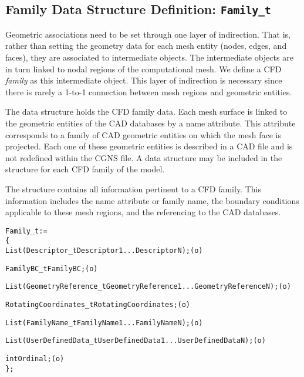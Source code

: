 \subsection{Family Data Structure Definition: \texttt{Family\_t}}
\label{s:Family}

Geometric associations need to be set through one layer of indirection.
That is, rather than setting the geometry data for each mesh entity
(nodes, edges, and faces), they are associated to intermediate objects.
The intermediate objects are in turn linked to nodal regions of the
computational mesh.
We define a CFD \emph{family} as this intermediate object.
This layer of indirection is necessary since there is rarely a 1-to-1
connection between mesh regions and geometric entities.

The  data structure holds the CFD family data.
Each mesh surface is linked to the geometric entities of the CAD databases
by a name attribute.
This attribute corresponds to a family of CAD geometric entities on which
the mesh face is projected.
Each one of these geometric entities is described in a CAD file and is not
redefined within the CGNS file.
A  data structure may be included in the 
structure for each CFD family of the model.

The  structure contains all information pertinent to a
CFD family.
This information includes the name attribute or family name, the
boundary conditions applicable to these mesh regions, and the referencing
to the CAD databases.

\begin{alltt}
  Family\_t :=
    \{
    List( Descriptor\_t Descriptor1 ... DescriptorN ) ;                      (o)

    FamilyBC\_t FamilyBC ;                                                   (o)

    List( GeometryReference\_t GeometryReference1 ... GeometryReferenceN ) ; (o)

    RotatingCoordinates\_t RotatingCoordinates ;                             (o)

    List( FamilyName\_t FamilyName1 ... FamilyNameN ) ;                      (o)

    List( UserDefinedData\_t UserDefinedData1 ... UserDefinedDataN ) ;       (o)

    int Ordinal ;                                                           (o)
    \} ;
\end{alltt}

